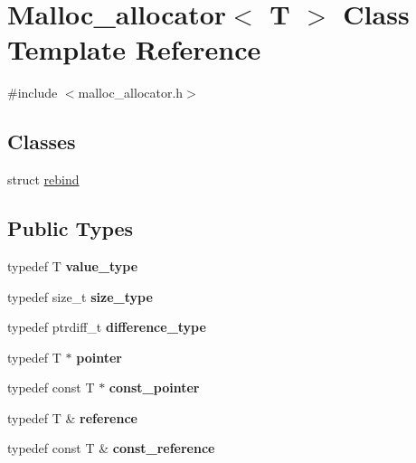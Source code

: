 \hypertarget{classMalloc__allocator}{}\section{Malloc\+\_\+allocator$<$ T $>$ Class Template Reference}
\label{classMalloc__allocator}


{\ttfamily \#include $<$malloc\+\_\+allocator.\+h$>$}

\subsection*{Classes}
\begin{DoxyCompactItemize}
\item 
struct \mbox{\hyperlink{structMalloc__allocator_1_1rebind}{rebind}}
\end{DoxyCompactItemize}
\subsection*{Public Types}
\begin{DoxyCompactItemize}
\item 
\mbox{\label{classMalloc__allocator_a565715652b9b0ac9578b7700df438ca1}} 
typedef T {\bfseries value\+\_\+type}
\item 
\mbox{\label{classMalloc__allocator_a0ffbf5673a8d2abc05b06d7223773b5a}} 
typedef size\+\_\+t {\bfseries size\+\_\+type}
\item 
\mbox{\label{classMalloc__allocator_ae614c529ab0e51cac457f967660002c8}} 
typedef ptrdiff\+\_\+t {\bfseries difference\+\_\+type}
\item 
\mbox{\label{classMalloc__allocator_ad3fc47addba8c0c45c4ccd687b537161}} 
typedef T $\ast$ {\bfseries pointer}
\item 
\mbox{\label{classMalloc__allocator_ab9076e081c295ae92548f81b091f227a}} 
typedef const T $\ast$ {\bfseries const\+\_\+pointer}
\item 
\mbox{\label{classMalloc__allocator_a23ad18f51e1f61ba7401131ae037af8e}} 
typedef T \& {\bfseries reference}
\item 
\mbox{\label{classMalloc__allocator_afd81e01005ce820e1aacdf2caa0c1549}} 
typedef const T \& {\bfseries const\+\_\+reference}
\end{DoxyCompactItemize}
